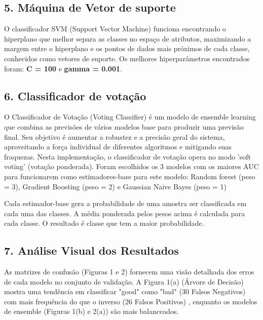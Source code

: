 \subsection*{5. Máquina de Vetor de suporte}
O classificador SVM (Support Vector Machine) funciona encontrando o hiperplano que melhor separa as classes no espaço de atributos, maximizando a margem entre o hiperplano e os pontos de dados mais próximos de cada classe, conhecidos como vetores de suporte. 
Os melhores hiperparâmetros encontrados foram: \textbf{C = 100} e \textbf{gamma = 0.001}.
\vspace{5mm}
\subsection*{6. Classificador de votação}
O Classificador de Votação (Voting Classifier) é um modelo de ensemble learning que combina as previsões de vários modelos base para produzir uma previsão final. Seu objetivo é aumentar a robustez e a precisão geral do sistema, aproveitando a força individual de diferentes algoritmos e mitigando suas fraquezas. 
Nesta implementação, o classificador de votação opera no modo 'soft voting' (votação ponderada). Foram escolhidos os 3 modelos com os maiores AUC para funcionarem como estimadores-base para este modelo: Random forest (peso = 3), Gradient Boosting (peso = 2) e Gaussian Naive Bayes (peso = 1)

Cada estimador-base gera a probabilidade de uma amostra ser classificada em cada uma das classes. A média ponderada pelos pesos acima é calculada para cada classe. O resultado é classe que tem a maior probabilidade.
\vspace{5mm}
\subsection*{7. Análise Visual dos Resultados}
As matrizes de confusão (Figuras 1 e 2) fornecem uma visão detalhada dos erros de cada modelo no conjunto de validação.
A Figura 1(a) (Árvore de Decisão) mostra uma tendência em classificar "good" como "bad" (30 Falsos Negativos) com mais frequência do que o inverso (26 Falsos Positivos) , enquanto os modelos de ensemble (Figuras 1(b) e 2(a)) são mais balanceados.

